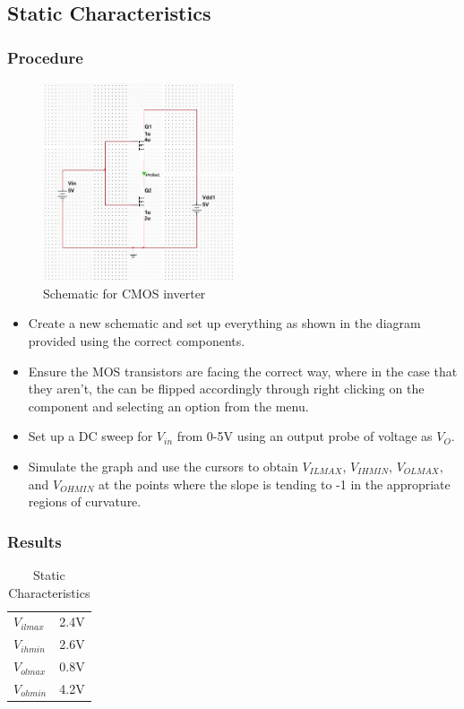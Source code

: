 \documentclass[12pt]{article}
\begin{document}
\subsection{Static Characteristics}
\subsubsection{Procedure}
\begin{figure}[H]
\centering
\includegraphics[width=0.5\textwidth]{5.jpg}
\caption{Schematic for CMOS inverter}
\end{figure}
\begin{itemize}
\item Create a new schematic and set up everything as shown in the diagram provided using the correct components.
\item Ensure the MOS transistors are facing the correct way, where in the case that they aren't, the can be flipped accordingly through right clicking on the component and selecting an option from the menu.
\item Set up a DC sweep for $V_{in}$ from 0-5V using an output probe of voltage as $V_O$.
\item Simulate the graph and use the cursors to obtain $V_{IL MAX}$, $V_{IH MIN}$, $V_{OL MAX}$, and $V_{OH MIN}$ at the points where the slope is tending to -1 in the appropriate regions of curvature.
\end{itemize}

\subsubsection{Results}

\begin{table}[H]
\centering
\begin{tabular}{ll}
$V_{il max}$ & 2.4V \\
$V_{ih min}$ & 2.6V \\
$V_{ol max}$ & 0.8V \\
$V_{oh min}$ & 4.2V
\end{tabular}
\caption{Static Characteristics}
\end{table}
\end{document}
